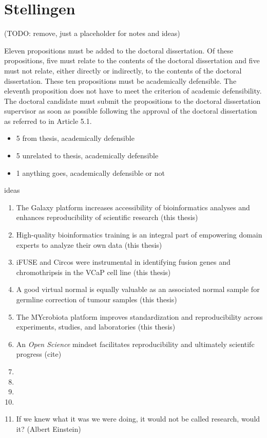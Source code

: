 \chapter*{Stellingen}

(TODO: remove, just a placeholder for notes and ideas)


Eleven propositions must be added to the doctoral dissertation. Of these propositions,
five must relate to the contents of the doctoral dissertation and five must not relate,
either directly or indirectly, to the contents of the doctoral dissertation. These ten
propositions must be academically defensible. The eleventh proposition does not have
to meet the criterion of academic defensibility. The doctoral candidate must submit the
propositions to the doctoral dissertation supervisor as soon as possible following the
approval of the doctoral dissertation as referred to in Article 5.1.

\begin{itemize}
\item 5 from thesis, academically defensible
\item 5 unrelated to thesis, academically defensible
\item 1 anything goes, academically defensible or not
\end{itemize}

ideas

\begin{enumerate}
\item The Galaxy platform increases accessibility of bioinformatics analyses and enhances reproducibility of scientific research (this thesis)
\item High-quality bioinformatics training is an integral part of empowering domain experts to analyze their own data (this thesis)
\item iFUSE and Circos were instrumental in identifying fusion genes and chromothripsis in the VCaP cell line (this thesis)
\item A good virtual normal is equally valuable as an associated normal sample for germline correction of tumour samples (this thesis)
\item The MYcrobiota platform improves standardization and reproducibility across experiments, studies, and laboratories (this thesis)
\item An \textit{Open Science} mindset facilitates reproducibility and ultimately scientifc progress (cite)
\item
\item
\item
\item
\item If we knew what it was we were doing, it would not be called research, would it? (Albert Einstein)
\end{enumerate}

